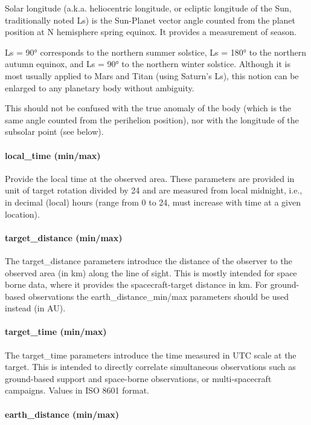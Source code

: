 \documentclass[11pt,a4paper]{ivoa}
\begin{document}
Solar longitude (a.k.a. heliocentric longitude, or ecliptic longitude of
the Sun, traditionally noted Ls) is the Sun-Planet vector angle counted
from the planet position at N hemisphere spring equinox. It provides a
measurement of season.

Ls = 90° corresponds to the northern summer solstice, Ls = 180°
to the northern autumn equinox, and Ls = 90° to the northern winter
solstice. Although it is most usually applied to Mars and Titan (using
Saturn's Ls), this notion can be enlarged to any planetary body without
ambiguity.

This should not be confused with the true anomaly of the body (which
is the same angle counted from the perihelion position), nor with the
longitude of the subsolar point (see below).

\paragraph{local\_time (min/max)}

Provide the local time at the observed area. These parameters are
provided in unit of target rotation divided by 24 and are measured from
local midnight, i.e., in decimal (local) hours (range from 0 to 24,
must increase with time at a given location).

\paragraph{target\_distance (min/max)}

The target\_distance parameters introduce the distance of the observer
to the observed area (in km) along the line of sight. This is mostly
intended for space borne data, where it provides the spacecraft-target
distance in km. For ground-based observations the earth\_distance\_min/max
parameters should be used instead (in AU).

\paragraph{target\_time (min/max)}

The target\_time parameters introduce the time measured in UTC scale
at the target. This is intended to directly correlate simultaneous
observations such as ground-based support and space-borne observations,
or multi-spacecraft campaigns. Values in ISO 8601 format.

\paragraph{earth\_distance (min/max)}
\end{document}

